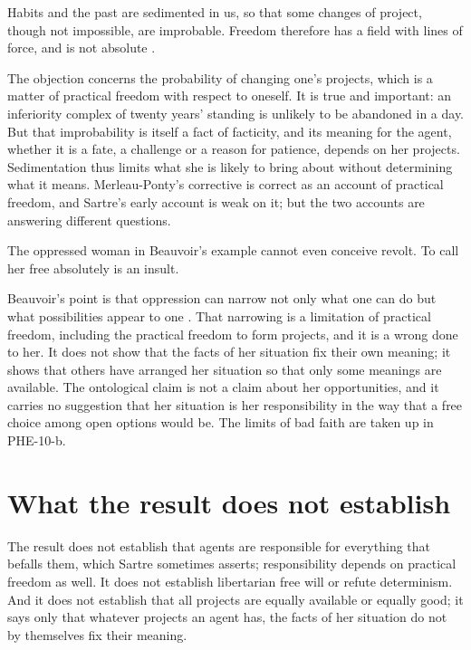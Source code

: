 \documentclass{situationist-preprint}
\begin{document}
\begin{objection}[Sedimentation]\label{o:sed}
Habits and the past are sedimented in us, so that some changes of project, though not impossible, are improbable. Freedom therefore has a field with lines of force, and is not absolute \citep{MerleauPonty1945}.
\end{objection}

\begin{reply}
The objection concerns the probability of changing one's projects, which is a matter of practical freedom with respect to oneself. It is true and important: an inferiority complex of twenty years' standing is unlikely to be abandoned in a day. But that improbability is itself a fact of facticity, and its meaning for the agent, whether it is a fate, a challenge or a reason for patience, depends on her projects. Sedimentation thus limits what she is likely to bring about without determining what it means. Merleau-Ponty's corrective is correct as an account of practical freedom, and Sartre's early account is weak on it; but the two accounts are answering different questions.
\end{reply}

\begin{objection}[Oppression]\label{o:opp}
The oppressed woman in Beauvoir's example cannot even conceive revolt. To call her free absolutely is an insult.
\end{objection}

\begin{reply}
Beauvoir's point is that oppression can narrow not only what one can do but what possibilities appear to one \citep{Beauvoir1947}. That narrowing is a limitation of practical freedom, including the practical freedom to form projects, and it is a wrong done to her. It does not show that the facts of her situation fix their own meaning; it shows that others have arranged her situation so that only some meanings are available. The ontological claim is not a claim about her opportunities, and it carries no suggestion that her situation is her responsibility in the way that a free choice among open options would be. The limits of bad faith are taken up in PHE-10-b.
\end{reply}

\section{What the result does not establish}

The result does not establish that agents are responsible for everything that befalls them, which Sartre sometimes asserts; responsibility depends on practical freedom as well. It does not establish libertarian free will or refute determinism. And it does not establish that all projects are equally available or equally good; it says only that whatever projects an agent has, the facts of her situation do not by themselves fix their meaning.
\end{document}
